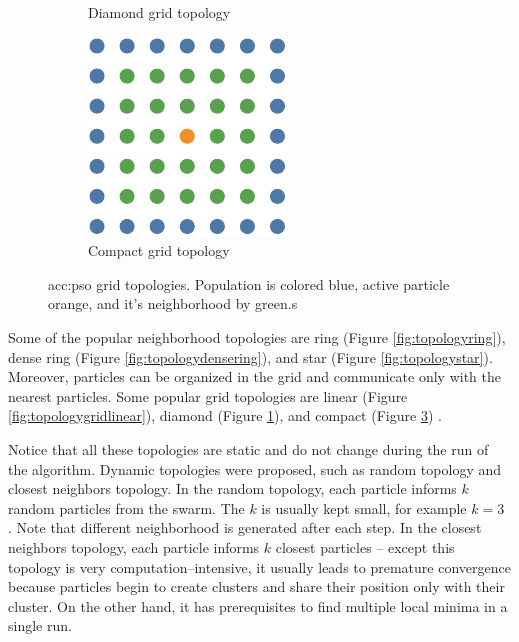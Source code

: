 \begin{figure}[t]
\begin{subfigure}[t]{0.3\textwidth}
        \caption{Diamond grid topology}
        \label{fig:topologygriddiamond}
    \end{subfigure}
    \hfill
    \begin{subfigure}[t]{0.3\textwidth}
        \includegraphics[width=\textwidth]{img/master_neigh_compact.pdf}
        \caption{Compact grid topology}
        \label{fig:topologygridcompact}
    \end{subfigure}
    \caption[\acrshort*{acc:pso} grid topologies]{\acrshort*{acc:pso} grid topologies. Population is colored blue, active particle orange, and it's neighborhood by green.s}
\end{figure}

Some of the popular neighborhood topologies are ring (Figure \ref{fig:topologyring}), dense ring (Figure \ref{fig:topologydensering}), and star (Figure \ref{fig:topologystar}). Moreover, particles can be organized in the grid and communicate only with the nearest particles. Some popular grid topologies are linear (Figure \ref{fig:topologygridlinear}), diamond (Figure \ref{fig:topologygriddiamond}), and compact (Figure \ref{fig:topologygridcompact}) \citep{PSOtopologies}.

Notice that all these topologies are static and do not change during the run of the algorithm. Dynamic topologies were proposed, such as random topology and closest neighbors topology. In the random topology, each particle informs $k$ random particles from the swarm. The $k$ is usually kept small, for example $k=3$ \citep{SPSObenchmark}. Note that different neighborhood is generated after each step. In the closest neighbors topology, each particle informs $k$ closest particles -- except this topology is very computation--intensive, it usually leads to premature convergence because particles begin to create clusters and share their position only with their cluster. On the other hand, it has prerequisites to find multiple local minima in a single run.

